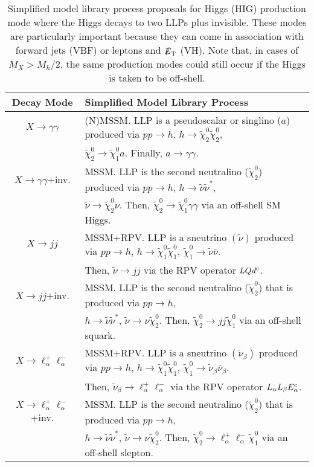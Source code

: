 \begin{table}
\begin{center}
\begin{tabular}{ |c|l|} 
 \hline
Decay Mode & Simplified Model Library Process \\
\hline\hline
$X\rightarrow \gamma\gamma$ & (N)MSSM. LLP is a pseudoscalar or singlino ($a$)   produced via $pp\rightarrow h$, $h\rightarrow \tilde\chi_2^0\tilde\chi_2^0$,    \\
& $\tilde\chi_2^0\rightarrow\tilde\chi_1^0a$. Finally, $a\rightarrow\gamma\gamma$. \\
\hline
$X\rightarrow \gamma\gamma$+inv. & MSSM. LLP is the second neutralino  ($\tilde\chi_2^0$)   produced via $pp\rightarrow h$, $h\rightarrow \tilde\nu\tilde\nu^*$,    \\
&  $\tilde\nu\rightarrow\tilde\chi_2^0\nu$. Then,  $\tilde\chi_2^0\rightarrow\tilde\chi_1^0\gamma\gamma$ via an off-shell SM Higgs. \\
\hline
$X\rightarrow jj$& MSSM+RPV. LLP is a sneutrino $(\tilde\nu)$ produced via  $pp\rightarrow h$, $h\rightarrow \tilde\chi_1^0\tilde\chi_1^0$, $\tilde\chi_1^0\rightarrow \tilde\nu\bar\nu$.      \\
&   Then, $\tilde\nu\rightarrow jj$  via the RPV operator $LQd^{\rm c}$.\\
\hline
$X\rightarrow jj$+inv.& MSSM. LLP is the second neutralino ($\tilde\chi_2^0$) that is produced via $pp\rightarrow h $,  \\
& $h\rightarrow \tilde\nu\tilde\nu^*$, $\tilde\nu\rightarrow \nu\tilde\chi_2^0$.  Then, $\tilde\chi_2^0\rightarrow jj\tilde\chi_1^0$  via an  off-shell  squark.\\
\hline
$X\rightarrow \ell_\alpha^+\ell_\alpha^-$ &  MSSM+RPV. LLP is a sneutrino $(\tilde\nu_\beta)$ produced via  $pp\rightarrow h$, $h\rightarrow \tilde\chi_1^0\tilde\chi_1^0$, $\tilde\chi_1^0\rightarrow \tilde\nu_\beta\bar\nu_\beta$.     \\
&    Then, $\tilde\nu_\beta\rightarrow \ell_\alpha^+\ell_\alpha^-$  via the RPV operator $L_\alpha L_\beta E^{\rm c}_\alpha$.\\
\hline
$X\rightarrow \ell_\alpha^+\ell_\alpha^-$+inv. & MSSM. LLP is the second neutralino ($\tilde\chi_2^0$) that is produced via $pp\rightarrow h $,  \\
& $h\rightarrow \tilde\nu\tilde\nu^*$, $\tilde\nu\rightarrow \nu\tilde\chi_2^0$.  Then, $\tilde\chi_2^0\rightarrow \ell_\alpha^+\ell_\alpha^-\tilde\chi_1^0$  via an  off-shell  slepton.\\

\hline
\end{tabular}
\end{center}
\caption{Simplified model library process proposals for Higgs (HIG) production mode where the Higgs decays to two LLPs plus invisible. These modes are particularly important because they can come in association with forward jets (VBF) or leptons and $\slashed{E}_{\rm T}$ (VH). Note that, in cases of $M_X>M_h/2$, the same production modes could still occur if the Higgs is taken to be off-shell.  }\label{tab:Higgs_inv_neutral_library}
\end{table}

